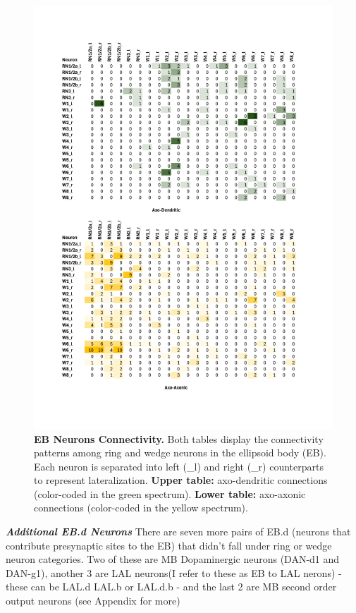             \begin{figure}[H]
                \centering
                \includegraphics[width=12cm]{Figs/CX/EBneuronsmatrix.pdf}
                \caption{\textbf{EB Neurons Connectivity.} Both tables display the connectivity patterns among ring and wedge neurons in the ellipsoid body (EB). Each neuron is separated into left (\_l) and right (\_r) counterparts to represent lateralization. \textbf{Upper table:} axo-dendritic connections (color-coded in the green spectrum). \textbf{Lower table:} axo-axonic connections (color-coded in the yellow spectrum).}
                \label{EBmatrix}
            \end{figure}

            \textbf{\textit{Additional EB.d Neurons}}
            There are seven more pairs of EB.d (neurons that contribute presynaptic sites to the EB) that didn't fall under ring or wedge neuron categories. Two of these are MB Dopaminergic neurons (DAN-d1 and DAN-g1), another 3 are LAL neurons(I refer to these as EB to LAL nerons) - these can be LAL.d LAL.b or LAL.d.b - and the last 2 are MB second order output neurons (see Appendix for more)%

